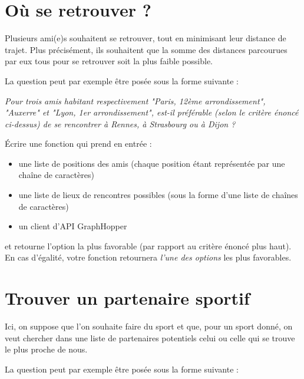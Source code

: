 \documentclass[11pt,a4paper]{article}
\begin{document}
\section{Où se retrouver ?}

Plusieurs ami(e)s souhaitent se retrouver, tout en minimisant leur distance de trajet. Plus précisément, ils souhaitent que la somme des distances parcourues par eux tous pour se retrouver soit la plus faible possible.
    
La question peut par exemple être posée sous la forme suivante :
    
\emph{Pour trois amis habitant respectivement "Paris, 12ème arrondissement", "Auxerre" et "Lyon, 1er arrondissement", est-il préférable (selon le critère énoncé ci-dessus) de se rencontrer à Rennes, à Strasbourg ou à Dijon ?}
\newpage

Écrire une fonction qui prend en entrée :
\begin{itemize}

         \item une liste de positions des amis (chaque position étant représentée par une chaîne de caractères)
           \item une liste de lieux de rencontres possibles (sous la forme d'une liste de chaînes de caractères)
            \item un client d'API GraphHopper
\end{itemize}
        et retourne l'option la plus favorable (par rapport au critère énoncé plus haut). En cas d'égalité, votre fonction retournera \emph{l'une des options} les plus favorables.

\section{Trouver un partenaire sportif}
Ici, on suppose que l'on souhaite faire du sport et que, pour un sport donné, on veut chercher dans une liste de partenaires potentiels celui ou celle qui se trouve le plus proche de nous.

La question peut par exemple être posée sous la forme suivante :
\end{document}
